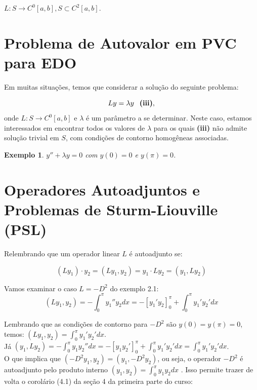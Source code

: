 \documentclass[a4paper,portuguese,9pt,final]{extarticle}
\newtheorem{example}{Exemplo}[section]
\begin{document}
\begin{multicols*}{2}
\begin{enumerate}
            $ L:S\to C^{0}[a,b], S \subset C^2 [a,b].$
    \end{enumerate}

\section{Problema de Autovalor em PVC para EDO}


    Em muitas situações, temos que considerar a solução do seguinte problema:

    $$Ly=\lambda y  \mbox{\textbf{ \ (iii)}},$$
    onde $ L:S\to C^{0}[a,b] $ e $\lambda$ é um parâmetro a se determinar. Neste caso, estamos interessados em encontrar todos os valores de $\lambda$ para os quais \textbf{(iii)} não admite solução trivial em $ S $, com condições de contorno homogêneas associadas.

    \begin{example}	
        $y'' + \lambda y = 0$ com $y(0) = 0$ e $y(\pi) = 0$.
    \end{example}

\section{Operadores Autoadjuntos e Problemas de Sturm-Liouville (PSL)}

    
    Relembrando que um operador linear $L$ é autoadjunto se:

    $$ (Ly_{1}) \cdot y_{2} = (Ly_{1} , y_{2}) = y_{1} \cdot Ly_{2} =  (y_{1} , Ly_{2})$$


    Vamos examinar o caso $ L=-D^{2} $ do exemplo 2.1:
    $$ (Ly_{1} , y_{2}) = -\int_{0}^{\pi} y_{1}''y_{2}dx=-\left[y_{1}'y_{2}\right]_{0}^{\pi} + \int_{0}^{\pi} y_{1}'y_{2}'dx $$


    Lembrando que as condições de contorno para $ -D^{2} $ são $ y(0) = y(\pi) = 0 $, temos:
    $ \displaystyle (Ly_{1} , y_{2}) = \int_{0}^{\pi} y_{1}'y_{2}'dx  $. \\

    Já $ \displaystyle (y_{1} , Ly_{2}) = -\int_{0}^{\pi} y_{1}y_{2}''dx=-\left[y_{1}y_{2}'\right]_{0}^{\pi} + \int_{0}^{\pi} y_{1}'y_{2}'dx = \int_{0}^{\pi} y_{1}'y_{2}'dx $. \\


    O que implica que $ (-D^{2}y_{1} , y_{2})=(y_{1} , -D^{2}y_{2} ) $, ou seja, o operador $ -D^{2} $ é autoadjunto pelo produto interno $ \displaystyle (y_{1},y_{2}) = \int_{0}^{\pi}y_{1} y_{2} dx $ . Isso permite trazer de volta o corolário (4.1) da seção 4 da primeira parte do curso: \\


\end{multicols*}
\end{document}
